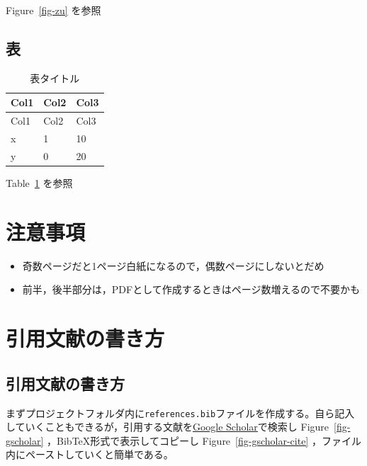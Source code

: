 \documentclass[
  b5paper,
  xelatex, ja=standard]{bxjsbook}
\providecommand{\tightlist}{%
  \setlength{\itemsep}{0pt}\setlength{\parskip}{0pt}}\usepackage{longtable,booktabs,array}
\begin{document}
Figure~\ref{fig-zu} を参照

\section{表}\label{ux8868}

\begin{longtable}[]{@{}lll@{}}
\caption{表タイトル}\label{tbl-hyo}\tabularnewline
\toprule\noalign{}
Col1 & Col2 & Col3 \\
\midrule\noalign{}
\endfirsthead
\toprule\noalign{}
Col1 & Col2 & Col3 \\
\midrule\noalign{}
\endhead
\bottomrule\noalign{}
\endlastfoot
x & 1 & 10 \\
y & 0 & 20 \\
\end{longtable}

Table~\ref{tbl-hyo} を参照


\chapter{注意事項}\label{sec-caution}

\begin{itemize}
\tightlist
\item
  奇数ページだと1ページ白紙になるので，偶数ページにしないとだめ
\item
  前半，後半部分は，PDFとして作成するときはページ数増えるので不要かも
\end{itemize}


\chapter{引用文献の書き方}\label{sec-sanko}

\section{引用文献の書き方}\label{ux5f15ux7528ux6587ux732eux306eux66f8ux304dux65b9}

まずプロジェクトフォルダ内に\texttt{references.bib}ファイルを作成する。自ら記入していくこともできるが，引用する文献を\href{https://scholar.google.com/}{Google
Scholar}で検索し Figure~\ref{fig-gscholar}
，BibTeX形式で表示してコピーし Figure~\ref{fig-gscholar-cite}
，ファイル内にペーストしていくと簡単である。
\end{document}
